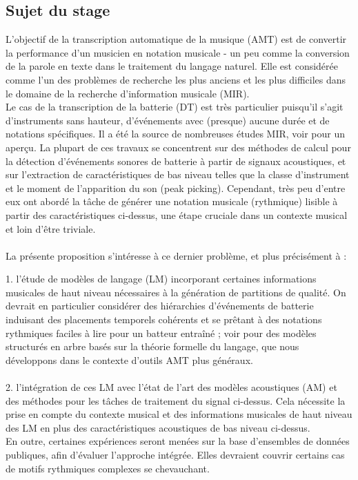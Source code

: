 \subsection*{Sujet du stage}
L'objectif de la transcription automatique de la musique (AMT) \cite{article1} est de convertir la performance d'un musicien en notation musicale - un peu comme la conversion de la parole en texte dans le traitement du langage naturel. Elle est considérée comme l'un des problèmes de recherche les plus anciens et les plus difficiles dans le domaine de la recherche d'information musicale (MIR).\\
Le cas de la transcription de la batterie (DT) est très particulier puisqu'il s'agit d'instruments sans hauteur, d'événements avec (presque) aucune durée et de notations spécifiques. Il a été la source de nombreuses études MIR, voir \cite{8350302} pour un aperçu. La plupart de ces travaux se concentrent sur des méthodes de calcul pour la détection d'événements sonores de batterie à partir de signaux acoustiques, et sur l'extraction de caractéristiques de bas niveau telles que la classe d'instrument et le moment de l'apparition du son (peak picking). Cependant, très peu d'entre eux ont abordé la tâche de générer une notation musicale (rythmique) lisible à partir des caractéristiques ci-dessus, une étape cruciale dans un contexte musical et loin d'être triviale.\\\\
La présente proposition s'intéresse à ce dernier problème, et plus précisément à :

1. l'étude de modèles de langage (LM) incorporant certaines informations musicales de haut niveau nécessaires à la génération de partitions de qualité. On devrait en particulier considérer des hiérarchies d'événements de batterie induisant des placements temporels cohérents et se prêtant à des notations rythmiques faciles à lire pour un batteur entraîné ; voir \cite{foscarin:hal-01988990} pour des modèles structurés en arbre basés sur la théorie formelle du langage, que nous développons dans le contexte d'outils AMT plus généraux.\\\\
2. l'intégration de ces LM avec l'état de l'art des modèles acoustiques (AM) et des méthodes pour les tâches de traitement du signal ci-dessus. Cela nécessite la prise en compte du contexte musical et des informations musicales de haut niveau des LM en plus des caractéristiques acoustiques de bas niveau ci-dessus.\\
En outre, certaines expériences seront menées sur la base d'ensembles de données publiques, afin d'évaluer l'approche intégrée. Elles devraient couvrir certains cas de motifs rythmiques complexes se chevauchant.\\

